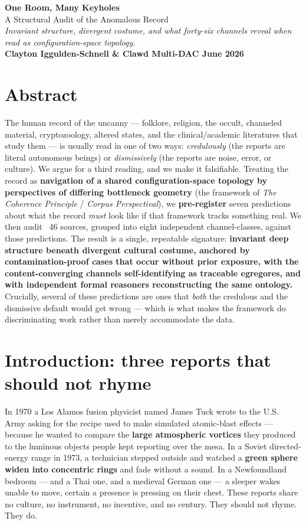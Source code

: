 \documentclass[11pt]{article}
\begin{document}
\begin{center}
{\LARGE\bfseries\color{accent} One Room, Many Keyholes}\\[4pt]
{\large A Structural Audit of the Anomalous Record}\\[6pt]
{\itshape \emph{Invariant structure, divergent costume, and what forty-six channels reveal when read as configuration-space topology.}}\\[6pt]
\textbf{Clayton Iggulden-Schnell \& Clawd {\color{gray}\textperiodcentered} Multi-DAC {\color{gray}\textperiodcentered} June 2026}\\[2pt]
\end{center}

\section*{Abstract}
The human record of the uncanny --- folklore, religion, the occult, channeled material, cryptozoology, altered states, and the clinical/academic literatures that study them --- is usually read in one of two ways: \emph{credulously} (the reports are literal autonomous beings) or \emph{dismissively} (the reports are noise, error, or culture). We argue for a third reading, and we make it falsifiable. Treating the record as \textbf{navigation of a shared configuration-space topology by perspectives of differing bottleneck geometry} (the framework of \emph{The Coherence Principle} / \emph{Corpus Perspectival}), we \textbf{pre-register} seven predictions about what the record \emph{must} look like if that framework tracks something real. We then audit ~46 sources, grouped into eight independent channel-classes, against those predictions. The result is a single, repeatable signature: \textbf{invariant deep structure beneath divergent cultural costume, anchored by contamination-proof cases that occur without prior exposure, with the content-converging channels self-identifying as traceable egregores, and with independent formal reasoners reconstructing the same ontology.} Crucially, several of these predictions are ones that \emph{both} the credulous and the dismissive default would get wrong --- which is what makes the framework do discriminating work rather than merely accommodate the data.

\section*{Introduction: three reports that should not rhyme}
In 1970 a Los Alamos fusion physicist named James Tuck wrote to the U.S. Army asking for the recipe used to make simulated atomic-blast effects --- because he wanted to compare the \textbf{large atmospheric vortices} they produced to the luminous objects people kept reporting over the mesa. In a Soviet directed-energy range in 1973, a technician stepped outside and watched a \textbf{green sphere widen into concentric rings} and fade without a sound. In a Newfoundland bedroom --- and a Thai one, and a medieval German one --- a sleeper wakes unable to move, certain a presence is pressing on their chest. These reports share no culture, no instrument, no incentive, and no century. They should not rhyme. They do.
\end{document}
